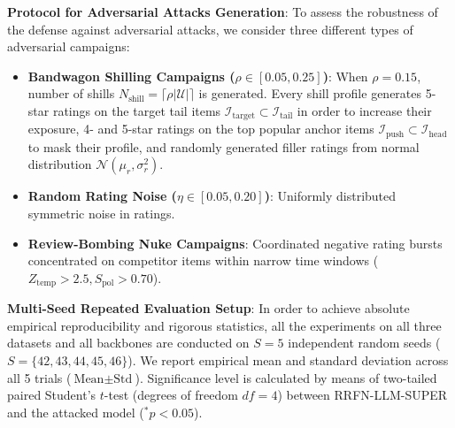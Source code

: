\documentclass[10pt,journal]{IEEEtran}
\begin{document}
\textbf{Protocol for Adversarial Attacks Generation}: To assess the robustness of the defense against adversarial attacks, we consider three different types of adversarial campaigns:
\begin{itemize}
    \item \textbf{Bandwagon Shilling Campaigns ($\rho \in [0.05, 0.25]$)}: When $\rho = 0.15$, number of shills $N_{\text{shill}} = \lceil \rho |\mathcal{U}| \rceil$ is generated. Every shill profile generates 5-star ratings on the target tail items $\mathcal{I}_{\text{target}} \subset \mathcal{I}_{\text{tail}}$ in order to increase their exposure, 4- and 5-star ratings on the top popular anchor items $\mathcal{I}_{\text{push}} \subset \mathcal{I}_{\text{head}}$ to mask their profile, and randomly generated filler ratings from normal distribution $\mathcal{N}(\mu_r, \sigma_r^2)$.
    \item \textbf{Random Rating Noise ($\eta \in [0.05, 0.20]$)}: Uniformly distributed symmetric noise in ratings.
    \item \textbf{Review-Bombing Nuke Campaigns}: Coordinated negative rating bursts concentrated on competitor items within narrow time windows ($Z_{\text{temp}} > 2.5, S_{\text{pol}} > 0.70$).
\end{itemize}

\textbf{Multi-Seed Repeated Evaluation Setup}: In order to achieve absolute empirical reproducibility and rigorous statistics, all the experiments on all three datasets and all backbones are conducted on $S = 5$ independent random seeds ($S = \{42, 43, 44, 45, 46\}$). We report empirical mean and standard deviation across all 5 trials ($\text{Mean} \pm \text{Std}$). Significance level is calculated by means of two-tailed paired Student's $t$-test (degrees of freedom $df = 4$) between RRFN-LLM-SUPER and the attacked model ($^*p < 0.05$).
\end{document}
